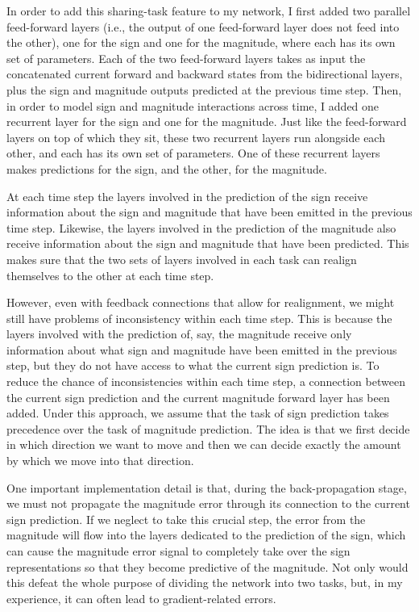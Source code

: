 In order to add this sharing-task feature to my network, I first added two parallel feed-forward layers (i.e., the output of one feed-forward layer does not feed into the other), one for the sign and one for the magnitude, where each has its own set of parameters.
Each of the two feed-forward layers takes as input the concatenated current forward and backward states from the bidirectional layers, plus the sign and magnitude outputs predicted at the previous time step.
Then, in order to model sign and magnitude interactions across time, I added one recurrent layer for the sign and one for the magnitude.
Just like the feed-forward layers on top of which they sit, these two recurrent layers run alongside each other, and each has its own set of parameters.
One of these recurrent layers makes predictions for the sign, and the other, for the magnitude.

At each time step the layers involved in the prediction of the sign receive information about the sign and magnitude that have been emitted in the previous time step.
Likewise, the layers involved in the prediction of the magnitude also receive information about the sign and magnitude that have been predicted.
This makes sure that the two sets of layers involved in each task can realign themselves to the other at each time step.

However, even with feedback connections that allow for realignment, we might still have problems of inconsistency within each time step.
This is because the layers involved with the prediction of, say, the magnitude receive only information about what sign and magnitude have been emitted in the previous step, but they do not have access to what the current sign prediction is.
To reduce the chance of inconsistencies within each time step, a connection between the current sign prediction and the current magnitude forward layer has been added.
Under this approach, we assume that the task of sign prediction takes precedence over the task of magnitude prediction.
The idea is that we first decide in which direction we want to move and then we can decide exactly the amount by which we move into that direction.

One important implementation detail is that, during the back-propagation stage, we must not propagate the magnitude error through its connection to the current sign prediction.
If we neglect to take this crucial step, the error from the magnitude will flow into the layers dedicated to the prediction of the sign, which can cause the magnitude error signal to completely take over the sign representations so that they become predictive of the magnitude.
Not only would this defeat the whole purpose of dividing the network into two tasks, but, in my experience, it can often lead to gradient-related errors.

